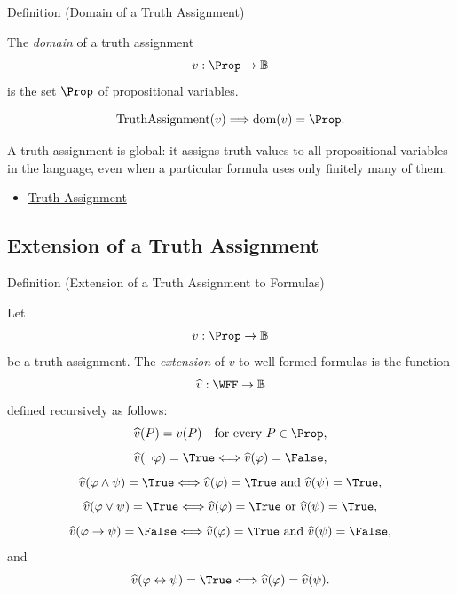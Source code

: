 \begin{definitionbox}{Definition (Domain of a Truth Assignment)}
\begin{definition}
\label{def:truth-assignment-domain-propositional-logic}
The \emph{domain} of a truth assignment
\[
v:\Prop\to\mathbb{B}
\]
is the set \(\Prop\) of propositional variables.
\end{definition}
\end{definitionbox}

\begin{remark*}
\[
\operatorname{TruthAssignment}(v)\Longrightarrow \operatorname{dom}(v)=\Prop.
\]
\end{remark*}

\begin{remark*}[Interpretation]
A truth assignment is global: it assigns truth values to all propositional
variables in the language, even when a particular formula uses only finitely many
of them.
\end{remark*}

\begin{dependencies}
\begin{itemize}
  \item \hyperref[def:truth-assignment-propositional-logic]{Truth Assignment}
\end{itemize}
\end{dependencies}

\subsection*{Extension of a Truth Assignment}
\label{subsec:extension-of-truth-assignment-propositional-logic}

\begin{definitionbox}{Definition (Extension of a Truth Assignment to Formulas)}
\begin{definition}
\label{def:extended-truth-assignment-propositional-logic}
Let
\[
v:\Prop\to\mathbb{B}
\]
be a truth assignment. The \emph{extension} of \(v\) to well-formed formulas is
the function
\[
\widehat v:\WFF\to\mathbb{B}
\]
defined recursively as follows:
\[
\widehat v(P)=v(P)
\quad\text{for every }P\in\Prop,
\]
\[
\widehat v(\neg\varphi)=\True
\Longleftrightarrow
\widehat v(\varphi)=\False,
\]
\[
\widehat v(\varphi\land\psi)=\True
\Longleftrightarrow
\widehat v(\varphi)=\True
\text{ and }
\widehat v(\psi)=\True,
\]
\[
\widehat v(\varphi\lor\psi)=\True
\Longleftrightarrow
\widehat v(\varphi)=\True
\text{ or }
\widehat v(\psi)=\True,
\]
\[
\widehat v(\varphi\to\psi)=\False
\Longleftrightarrow
\widehat v(\varphi)=\True
\text{ and }
\widehat v(\psi)=\False,
\]
and
\[
\widehat v(\varphi\leftrightarrow\psi)=\True
\Longleftrightarrow
\widehat v(\varphi)=\widehat v(\psi).
\]
\end{definition}
\end{definitionbox}

